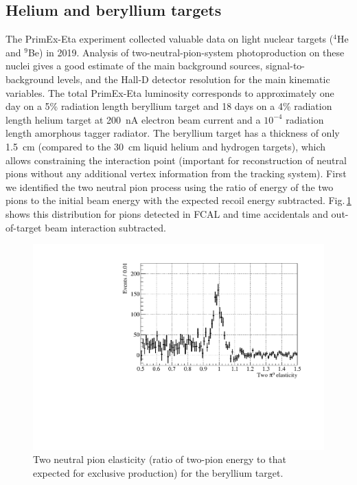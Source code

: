 
\subsection{Helium and beryllium targets}

The PrimEx-Eta experiment collected valuable data on light nuclear
targets ($^4$He and $^9$Be) in 2019. Analysis of two-neutral-pion-system
photoproduction on these nuclei gives a good estimate of the
main background sources, signal-to-background levels, and the Hall-D
detector resolution for the main kinematic variables. The total PrimEx-Eta luminosity
corresponds to approximately one day on
a 5\% radiation length beryllium target and 18 days on a
4\% radiation length helium target at 200~nA electron beam
current and a $10^{-4}$ radiation length amorphous tagger
radiator. The beryllium target has a thickness of only 1.5~cm
(compared to the 30~cm liquid helium and hydrogen targets), which allows
constraining the interaction point (important for reconstruction of neutral pions
without any additional vertex information from the
tracking system).  First we identified the two neutral pion
process using the ratio of energy of the two pions to the
initial beam energy with the expected recoil energy
subtracted. Fig.$\,$\ref{fig:pi0elastbe} shows this distribution for
pions detected in FCAL and time accidentals and out-of-target beam
interaction subtracted.
\begin{figure}[!h]
\centering\includegraphics[width=4.75in]{figures/be_elast1.pdf}
\caption{Two neutral pion elasticity (ratio of two-pion energy to that expected for exclusive production) for the beryllium target.
\label{fig:pi0elastbe}}
\end{figure}
